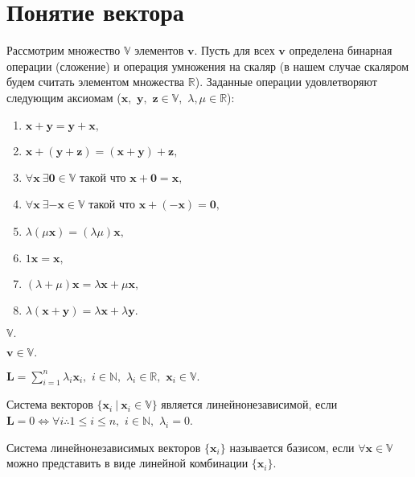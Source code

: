 \section{Понятие вектора}
Рассмотрим множество $\mathbb{V}$ элементов $\mathbf{v}.$ Пусть для всех $\mathbf{v}$ определена
бинарная операции (сложение) и операция умножения на скаляр (в нашем случае скаляром
будем считать элементом множества $\mathbb{R}$). Заданные операции удовлетворяют следующим
аксиомам 
($\mathbf{x},$ $\mathbf{y},$ $\mathbf{z} \in \mathbb{V},$ $\lambda, \mu \in \mathbb{R}$):
\begin{enumerate}
\item $\mathbf{x}+\mathbf{y} = \mathbf{y}+\mathbf{x},$
\item $\mathbf{x}+(\mathbf{y}+\mathbf{z}) = (\mathbf{x} + \mathbf{y}) + \mathbf{z},$
\item $\forall\mathbf{x}~\exists \mathbf{0} \in \mathbb{V}$ такой что $\mathbf{x}+\mathbf{0} = \mathbf{x},$
\item $\forall\mathbf{x}~\exists \mathbf{-x}\in\mathbb{V}$ такой что $\mathbf{x}+(\mathbf{-x})=\mathbf{0},$
\item $\lambda (\mu\mathbf{x}) = (\lambda \mu) \mathbf{x},$
\item $1\mathbf{x} = \mathbf{x},$
\item $(\lambda+\mu)\mathbf{x} = \lambda\mathbf{x} + \mu\mathbf{x},$
\item $\lambda (\mathbf{x} + \mathbf{y}) = \lambda \mathbf{x} + \lambda \mathbf{y}.$
\end{enumerate}
\begin{definition}$\mathbb{V}.$\end{definition}
\begin{definition}[Вектор]$\mathbf{v} \in \mathbb{V}.$
 \label{def:vec}
\end{definition}
\begin{definition}
$\mathbf{L} = \sum\limits_{i=1}^{n}\lambda_i \mathbf{x}_i,$ $i \in \mathbb{N},$
$\lambda_i \in \mathbb{R},$ $\mathbf{x}_i\in\mathbb{V}.$
\end{definition}
\begin{definition}
Система векторов $\{\mathbf{x}_i~\vert~\mathbf{x}_i\in \mathbb{V}\}$ является
линейнонезависимой, если $\mathbf{L}=0 \Leftrightarrow \forall i \therefore 1\le i\le n,$ $i\in\mathbb{N},$ 
$\lambda_i = 0.$
\end{definition}
\begin{definition}[Базис]
Система линейнонезависимых векторов $\{\mathbf{x}_i\}$ называется
базисом, если $\forall \mathbf{x} \in \mathbb{V}$ можно
представить в виде линейной комбинации $\{\mathbf{x}_i\}.$
\end{definition}
